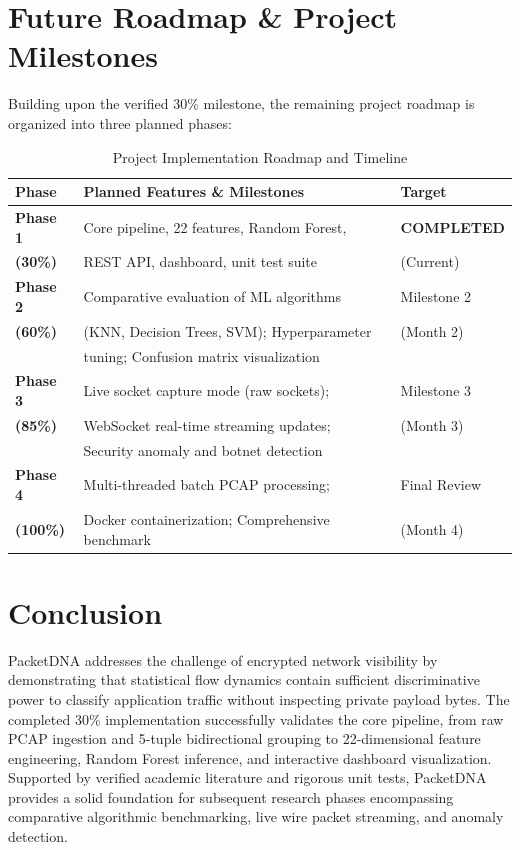 \documentclass[10pt,journal,compsoc]{IEEEtran}
\begin{document}
\section{Future Roadmap \& Project Milestones}
Building upon the verified 30\% milestone, the remaining project roadmap is organized into three planned phases:

\begin{table}[!t]
\centering
\caption{Project Implementation Roadmap and Timeline}
\label{tab:roadmap}
\begin{tabularx}{\columnwidth}{p{1.4cm}Xl}
\toprule
\textbf{Phase} & \textbf{Planned Features \& Milestones} & \textbf{Target} \\
\midrule
\textbf{Phase 1} & Core pipeline, 22 features, Random Forest, & \textbf{COMPLETED} \\
\textbf{(30\%)} & REST API, dashboard, unit test suite & (Current) \\
\midrule
\textbf{Phase 2} & Comparative evaluation of ML algorithms & Milestone 2 \\
\textbf{(60\%)} & (KNN, Decision Trees, SVM); Hyperparameter & (Month 2) \\
& tuning; Confusion matrix visualization & \\
\midrule
\textbf{Phase 3} & Live socket capture mode (raw sockets); & Milestone 3 \\
\textbf{(85\%)} & WebSocket real-time streaming updates; & (Month 3) \\
& Security anomaly and botnet detection & \\
\midrule
\textbf{Phase 4} & Multi-threaded batch PCAP processing; & Final Review \\
\textbf{(100\%)} & Docker containerization; Comprehensive benchmark & (Month 4) \\
\bottomrule
\end{tabularx}
\end{table}

\section{Conclusion}
PacketDNA addresses the challenge of encrypted network visibility by demonstrating that statistical flow dynamics contain sufficient discriminative power to classify application traffic without inspecting private payload bytes. The completed 30\% implementation successfully validates the core pipeline, from raw PCAP ingestion and 5-tuple bidirectional grouping to 22-dimensional feature engineering, Random Forest inference, and interactive dashboard visualization. Supported by verified academic literature and rigorous unit tests, PacketDNA provides a solid foundation for subsequent research phases encompassing comparative algorithmic benchmarking, live wire packet streaming, and anomaly detection.



\end{document}
